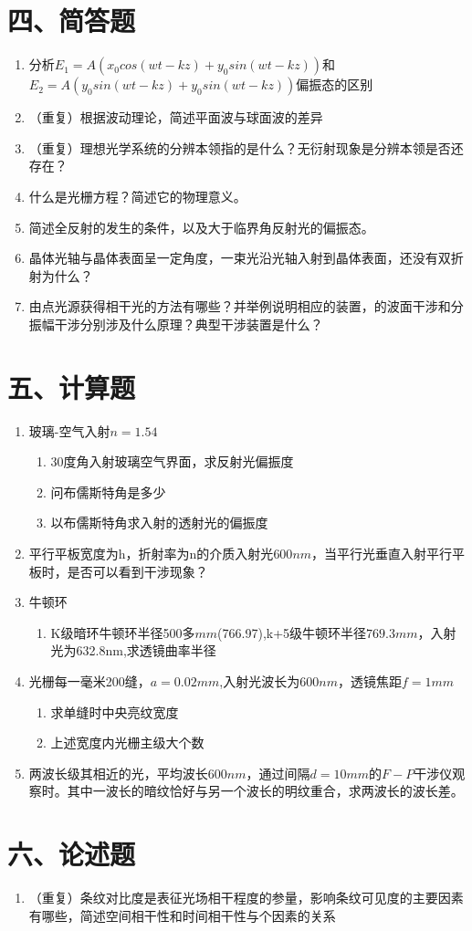\documentclass[12pt, a4paper]{article}
\theoremstyle{solution}
\begin{document}
\section*{四、简答题}
\begin{enumerate}
    \item 分析$E_1=A(x_0cos(wt-kz)+y_0sin(wt-kz))$和$E_2=A(y_0sin(wt-kz)+y_0sin(wt-kz))$偏振态的区别
    \item （重复）根据波动理论，简述平面波与球面波的差异
    \item （重复）理想光学系统的分辨本领指的是什么？无衍射现象是分辨本领是否还存在？
    \item 什么是光栅方程？简述它的物理意义。
    \item 简述全反射的发生的条件，以及大于临界角反射光的偏振态。
    \item 晶体光轴与晶体表面呈一定角度，一束光沿光轴入射到晶体表面，还没有双折射为什么？
    \item 由点光源获得相干光的方法有哪些？并举例说明相应的装置，的波面干涉和分振幅干涉分别涉及什么原理？典型干涉装置是什么？
\end{enumerate}
\section*{五、计算题}
\begin{enumerate}
    \item 玻璃-空气入射$n=1.54$
        \begin{enumerate}
            \item 30度角入射玻璃空气界面，求反射光偏振度
            \item 问布儒斯特角是多少
            \item 以布儒斯特角求入射的透射光的偏振度
        \end{enumerate}
    \item 平行平板宽度为h，折射率为n的介质入射光$600nm$，当平行光垂直入射平行平板时，是否可以看到干涉现象？
    \item 牛顿环
        \begin{enumerate}
            \item K级暗环牛顿环半径500多$mm$(766.97),k+5级牛顿环半径$769.3mm$，入射光为632.8nm,求透镜曲率半径
        \end{enumerate}
    \item 光栅每一毫米200缝，$a=0.02mm$,入射光波长为$600nm$，透镜焦距$f=1mm$
        \begin{enumerate}
            \item 求单缝时中央亮纹宽度
            \item 上述宽度内光栅主级大个数
        \end{enumerate}
    \item 两波长级其相近的光，平均波长$600nm$，通过间隔$d=10mm$的$F-P$干涉仪观察时。其中一波长的暗纹恰好与另一个波长的明纹重合，求两波长的波长差。
\end{enumerate}
\section*{六、论述题}
\begin{enumerate}
    \item （重复）条纹对比度是表征光场相干程度的参量，影响条纹可见度的主要因素有哪些，简述空间相干性和时间相干性与个因素的关系
\end{enumerate}
\end{document}
